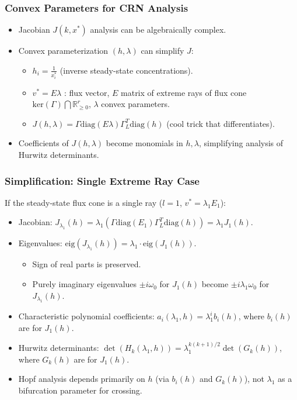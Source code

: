 \documentclass[aspectratio=169]{beamer}
\begin{document}
\begin{frame}{\insertsectionhead}
	\frametitle{Convex Parameters for CRN Analysis}
	\begin{itemize}
		\item Jacobian $J(k, x^*)$ analysis can be algebraically complex.
		\item \alert{Convex parameterization} $(h, \lambda)$ can simplify $J$:
			\begin{itemize}
				\item $h_i = \frac{1}{x_i^*}$ (inverse steady-state concentrations).
				\item $v^* = E\lambda$ : flux vector, $E$ matrix of extreme rays of flux cone $\text{ker}(\Gamma) \bigcap \mathbb{R}^r_{\ge 0}$, $\lambda$ convex parameters.
				\item $J(h, \lambda) = \Gamma \text{diag}(E\lambda) \Gamma_L^T \text{diag}(h)$ (cool trick that differentiates).
			\end{itemize}
		\item Coefficients of $J(h,\lambda)$ become \alert{monomials} in $h, \lambda$, simplifying analysis of Hurwitz determinants.
	\end{itemize}
\end{frame}

\begin{frame}{\insertsectionhead}
	\frametitle{Simplification: Single Extreme Ray Case}
	If the steady-state flux cone is a single ray ($l=1$, $v^* = \lambda_1 E_1$):
	\begin{itemize}
		\item Jacobian: $J_{\lambda_1}(h) = \lambda_1 (\Gamma \text{diag}(E_1) \Gamma_L^T \text{diag}(h)) = \lambda_1 J_1(h)$.
		\item Eigenvalues: $\text{eig}(J_{\lambda_1}(h)) = \lambda_1 \cdot \text{eig}(J_1(h))$.
			\begin{itemize}
				\item Sign of real parts is preserved.
				\item Purely imaginary eigenvalues $\pm i \omega_0$ for $J_1(h)$ become $\pm i \lambda_1 \omega_0$ for $J_{\lambda_1}(h)$.
			\end{itemize}
		\item Characteristic polynomial coefficients: $a_i(\lambda_1, h) = \lambda_1^i b_i(h)$, where $b_i(h)$ are for $J_1(h)$.
		\item Hurwitz determinants: $\det(H_k(\lambda_1,h)) = \lambda_1^{k(k+1)/2} \det(G_k(h))$, where $G_k(h)$ are for $J_1(h)$.
		\item \alert{Hopf analysis depends primarily on $h$ (via $b_i(h)$ and $G_k(h)$), not $\lambda_1$ as a bifurcation parameter for crossing.}
	\end{itemize}
\end{frame}
\end{document}
